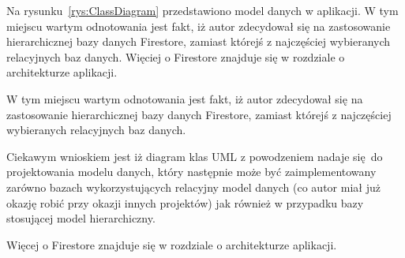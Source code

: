 Na rysunku~\ref{rys:ClassDiagram} przedstawiono model danych w aplikacji.
W tym miejscu wartym odnotowania jest fakt, iż autor zdecydował się
na zastosowanie hierarchicznej bazy danych Firestore, zamiast którejś z najczęściej
wybieranych relacyjnych baz danych.
Więciej o Firestore znajduje się w rozdziale o architekturze aplikacji.

W tym miejscu wartym odnotowania jest fakt, iż autor zdecydował się
na zastosowanie hierarchicznej bazy danych Firestore, zamiast którejś z najczęściej
wybieranych relacyjnych baz danych.

Ciekawym wnioskiem jest iż diagram klas UML z powodzeniem nadaje się do projektowania
modelu danych, który następnie może być zaimplementowany zarówno bazach
wykorzystujących relacyjny model danych (co autor miał już okazję robić
przy okazji innych projektów) jak również w przypadku bazy stosującej
model hierarchiczny.

Więcej o Firestore znajduje się w rozdziale o architekturze aplikacji.
